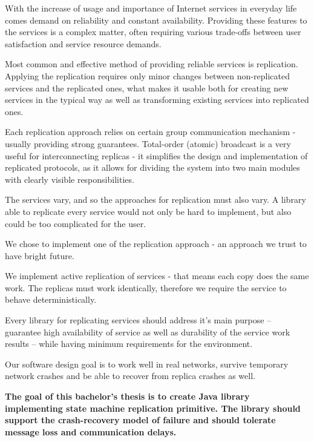 
With the increase of usage and importance of Internet services in everyday life comes demand on reliability and constant availability.
Providing these features to the services is a complex matter, often requiring various trade-offs between user satisfaction and service resource demands.

Most common and effective method of providing reliable services is replication. Applying the replication requires only minor changes between non-replicated services and the replicated ones, what makes it usable both for creating new services in the typical way %
as well as transforming existing services into replicated ones.

Each replication approach relies on certain group communication mechanism - usually providing strong guarantees. Total-order (atomic) broadcast is a very useful for interconnecting replicas - it simplifies the design and implementation of replicated protocols, as it allows for dividing the system into two main modules with clearly visible responsibilities.

The services vary, and so the approaches for replication must also vary. A library able to replicate every service would not only be hard to implement, but also could be too complicated for the user.

We chose to implement one of the replication approach - an approach we trust to have bright future.

We implement active replication of services - that means each copy does the same work. The replicas must work identically, therefore we require the service to behave deterministically.

Every library for replicating services should address it's main purpose -- guarantee high availability of service as well as durability of the service work results -- while having minimum requirements for the environment.

Our software design goal is to work well in real networks, survive temporary network crashes and be able to recover from replica crashes as well.

{
\bfseries
The goal of this bachelor's thesis is to create Java library implementing state machine replication primitive. The library should support the crash-recovery model of failure and should tolerate message loss and communication delays.
}


